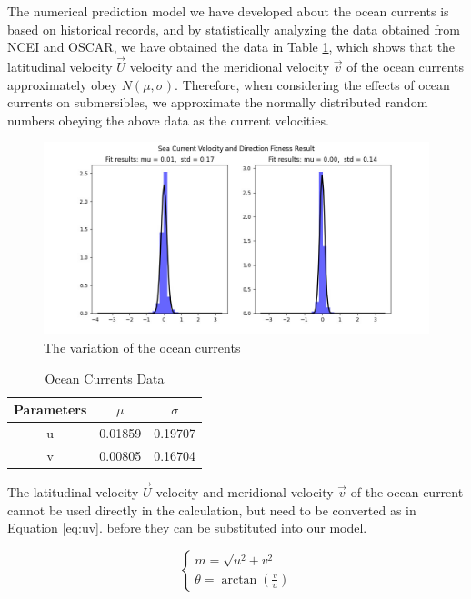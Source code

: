 \documentclass[12pt]{article}
\begin{document}
The numerical prediction model we have developed about the ocean currents is based on historical records, and by statistically analyzing the data obtained from NCEI and OSCAR, we have obtained the data in Table \ref{tab:currents}, which shows that the latitudinal velocity $\vec{U}$ velocity and the meridional velocity $\vec{v}$ of the ocean currents approximately obey $N(\mu,\sigma)$. Therefore, when considering the effects of ocean currents on submersibles, we approximate the normally distributed random numbers obeying the above data as the current velocities.

\begin{figure}
    \centering
    \includegraphics[width=.8\textwidth]{fig/sea_current.jpg}
    \caption{The variation of the ocean currents}
    \label{fig:currents}
\end{figure}


\begin{table}[!h]
    \centering
    \caption{Ocean Currents Data}
    \vspace{.4cm}
    \label{tab:currents}
    \begin{tabular}{ccc}
        \toprule
        Parameters & $\displaystyle \mu $ & $\displaystyle \sigma $ \\
        \midrule
        u          & 0.01859              & 0.19707                 \\
        v          & 0.00805              & 0.16704                 \\
        \bottomrule
    \end{tabular}
\end{table}

The latitudinal velocity $\vec{U}$ velocity and meridional velocity $\vec{v}$ of the ocean current cannot be used directly in the calculation, but need to be converted as in Equation \ref{eq:uv}. before they can be substituted into our model.

\begin{equation}
    \left\{
    \begin{aligned}
        m = \sqrt{u^2+v^2} \\
        \theta = \arctan\left(\frac{v}{u}\right) \label{eq:uv}
    \end{aligned}
    \right.
\end{equation}
\end{document}
